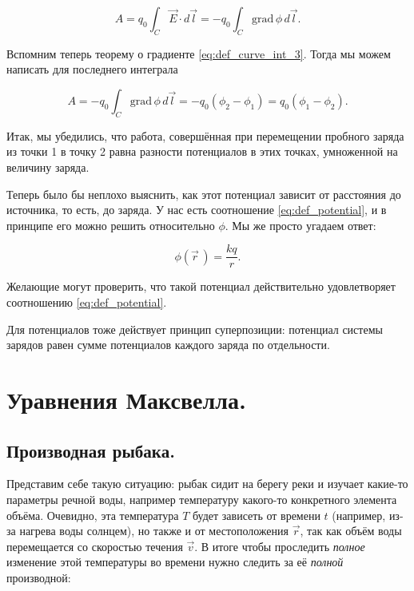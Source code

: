 \documentclass[a4paper,12pt]{article}
\numberwithin{equation}{section}
\newcommand{\grad}{\mathrm{grad}\,}
\begin{document}
\begin{equation}
  \label{eq:work_statics_1}
  A = q_0 \int_C \vec{E} \cdot d\vec{l} = -q_0 \int_C \grad \phi\, d\vec{l}.
\end{equation}

Вспомним теперь теорему о градиенте \eqref{eq:def_curve_int_3}. Тогда
мы можем написать для последнего интеграла

\begin{equation}
  \label{eq:work_statics_2}
  A = -q_0 \int_C \grad \phi\, d\vec{l} = -q_0 (\phi_2 - \phi_1) = q_0
  (\phi_1 - \phi_2). 
\end{equation}

Итак, мы убедились, что работа, совершённая при перемещении пробного
заряда из точки 1 в точку 2 равна разности потенциалов в этих точках,
умноженной на величину заряда. 

Теперь было бы неплохо выяснить, как этот потенциал зависит от
расстояния до источника, то есть, до заряда. У нас есть соотношение
\eqref{eq:def_potential}, и в принципе его можно решить относительно
$\phi$. Мы же просто угадаем ответ:

\begin{equation}
  \label{eq:potential_r}
  \phi(\vec{r}\,) = \frac{kq}{r}. 
\end{equation}

Желающие могут проверить, что такой потенциал действительно
удовлетворяет соотношению \eqref{eq:def_potential}. 

Для потенциалов тоже действует принцип суперпозиции: потенциал системы
зарядов равен сумме потенциалов каждого заряда по отдельности. 


\section{Уравнения Максвелла.}
\label{sec:maxwell}

\subsection{Производная рыбака.}
\label{sec:material_derivative}

Представим себе такую ситуацию: рыбак сидит на берегу реки и изучает
какие-то параметры речной воды, например температуру какого-то
конкретного элемента объёма. Очевидно, эта температура $T$ будет
зависеть от времени $t$ (например, из-за нагрева воды солнцем), но
также и от местоположения $\vec{r}$, так как объём воды перемещается
со скоростью течения $\vec{v}$. В итоге чтобы проследить
\textit{полное} изменение этой температуры во времени нужно следить за
её \textit{полной} производной: 
\end{document}
